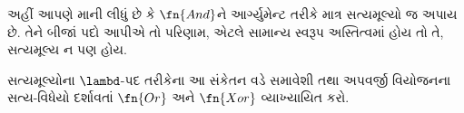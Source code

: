 \documentclass[../../../include/open-logic-section]{subfiles}
\begin{document}
અહીં આપણે માની લીધું છે કે $\fn{And}$ને
આર્ગ્યુમેન્ટ તરીકે માત્ર સત્યમૂલ્યો જ અપાય છે.
તેને બીજાં પદો આપીએ તો પરિણામ, એટલે સામાન્ય
સ્વરૂપ અસ્તિત્વમાં હોય તો તે, સત્યમૂલ્ય ન પણ હોય.

\begin{prob}
  સત્યમૂલ્યોના $\lambd$-પદ તરીકેના આ સંકેતન
  વડે સમાવેશી તથા અપવર્જી વિયોજનના સત્ય-વિધેયો
  દર્શાવતાં $\fn{Or}$ અને $\fn{Xor}$ વ્યાખ્યાયિત કરો.
\end{prob}
\end{document}
